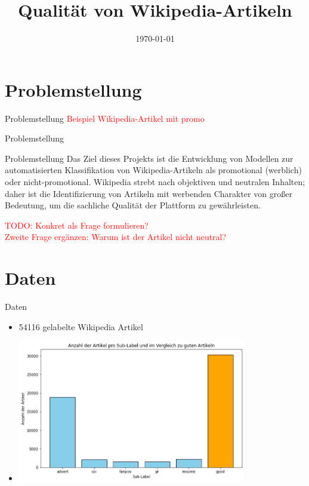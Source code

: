 \documentclass[aspectratio=169]{beamer} %
\title{Qualit\"at von Wikipedia-Artikeln}
\institute{Artificial Intelligence Group,\\
University of Hagen, Germany}
\date{\today}
\begin{document}




\begin{frame}
    \titlepage
\end{frame}
\nologo

\section{Problemstellung}

\begin{frame}{Problemstellung}
    \textcolor{red}{Beispiel Wikipedia-Artikel mit promo}
\end{frame}

\begin{frame}{Problemstellung}
    \begin{block}{Problemstellung}
        Das Ziel dieses Projekts ist die Entwicklung von Modellen zur automatisierten Klassifikation von Wikipedia-Artikeln als promotional (werblich) oder nicht-promotional. Wikipedia strebt nach objektiven und neutralen Inhalten; daher ist die Identifizierung von Artikeln mit werbenden Charakter von gro\ss{}er Bedeutung, um die sachliche Qualit\"at der Plattform zu gew\"ahrleisten.
    \end{block}
    \textcolor{red}{TODO: Konkret als Frage formulieren?\\ Zweite Frage ergänzen: Warum ist der Artikel nicht neutral?}
\end{frame}

\section{Daten}

\begin{frame}{Daten}
    \begin{itemize}
        \item 54116 gelabelte Wikipedia Artikel

        \item \includegraphics[width=10cm]{figures/distribution_multiple_classes.png}
    \end{itemize}
\end{frame}
\end{document}

